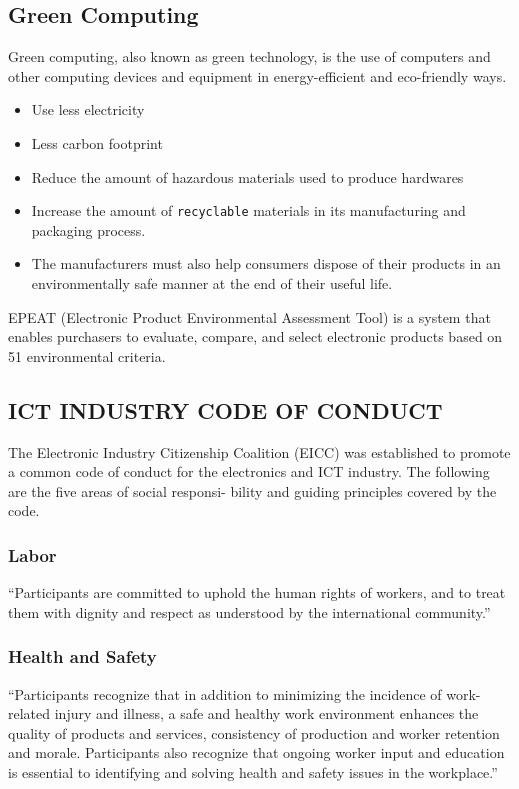 \documentclass[11pt]{article}
\begin{document}
\subsection{Green Computing}
\label{sec:orge2850f8}
Green computing, also known as green technology, is the use of computers and other computing devices and equipment in energy-efficient and eco-friendly ways.
\begin{itemize}
\item Use less electricity
\item Less carbon footprint
\item Reduce the amount of hazardous materials used to produce hardwares
\item Increase the amount of \texttt{recyclable} materials in its manufacturing and packaging process.
\item The manufacturers must also help consumers dispose of their products in an environmentally safe manner at the end of their useful life.
\end{itemize}

EPEAT (Electronic Product Environmental Assessment Tool) is a system that enables purchasers to evaluate, compare, and select electronic products based on 51 environmental criteria.
\subsection{ICT INDUSTRY CODE OF CONDUCT}
\label{sec:orga0c0ef8}
The Electronic Industry Citizenship Coalition (EICC) was established to promote a common code of conduct for the electronics and ICT industry. The following are the five areas of social responsi-
bility and guiding principles covered by the code.
\subsubsection{Labor}
\label{sec:org693567d}
“Participants are committed to uphold the human rights of workers, and to treat them with dignity and respect as understood by the international community.”

\subsubsection{Health and Safety}
\label{sec:orgb851370}
“Participants recognize that in addition to minimizing the incidence of work-related injury and illness, a safe and healthy work environment enhances the quality of products and services, consistency of production and worker retention and morale. Participants also recognize that
ongoing worker input and education is essential to identifying and solving health and safety issues in the workplace.”
\end{document}
